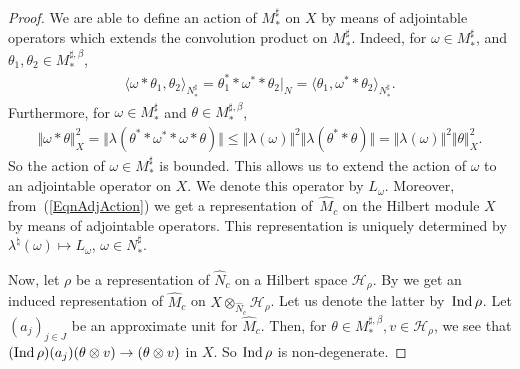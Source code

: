 \documentclass[pdftex]{sigma}
\numberwithin{equation}{section}
\theoremstyle{definition}
\newcommand{\cHil}{\mathcal{H}}
\newcommand{\Ind}{{\rm Ind}\,}
\begin{document}
\begin{proof}
We are able to def\/ine an action of $M_\ast^\sharp$ on $X$ by  means of adjointable operators which extends the convolution product on $M_\ast^\sharp$. Indeed, for $\omega\in M_\ast^\sharp$, and $\theta_1, \theta_2 \in M_\ast^{\sharp,\beta} $,
\begin{gather*}%
\langle \omega \ast \theta_1, \theta_2 \rangle_{N_\ast^\sharp} = \theta_1^\ast \ast \omega^\ast \ast \theta_2\vert_{N} =  \langle  \theta_1, \omega^\ast \ast \theta_2 \rangle_{N_\ast^\sharp}.
\end{gather*}
Furthermore, for $\omega \in M_\ast^\sharp$ and $\theta \in M_\ast^{\sharp, \beta}$,
\begin{gather}\label{EqnAdjAction}
\Vert \omega \ast \theta \Vert_X^2 = \Vert \lambda (\theta^\ast \ast \omega^\ast \ast \omega \ast \theta) \Vert \leq \Vert \lambda(\omega) \Vert^2 \Vert \lambda(\theta^\ast \ast \theta) \Vert = \Vert \lambda(\omega) \Vert^2 \Vert \theta\Vert_X^2.
\end{gather}
So the action of $\omega \in M_\ast^\sharp$ is bounded. This allows us to extend the action of $\omega$ to an adjointable operator on $X$. We denote this operator by $L_\omega$.  Moreover, from~(\ref{EqnAdjAction}) we get a representation of~$\hat{M}_c$ on the Hilbert module $X$ by means of adjointable operators. This representation is uniquely determined by $\lambda^\natural(\omega)   \mapsto L_\omega$, $\omega \in N_\ast^\sharp$.


Now, let $\rho$ be a representation of $\hat{N}_c$ on a Hilbert space $\cHil_\rho$. By  \cite[Proposition 2.66]{RaeWil} we get an induced representation of $\hat{M}_c$ on $X  \otimes_{\hat{N}_c} \cHil_\rho$. Let us denote the latter by~$\Ind \rho$. Let $(a_j)_{j \in J}$ be an approximate unit for $\hat{M}_c$. Then, for $\theta \in M_\ast^{\sharp, \beta}, v \in \cHil_\rho$, we see that $(\Ind \rho)(a_j) (\theta \otimes v) \rightarrow (\theta \otimes v)$ in $X$. So $\Ind \rho$ is non-degenerate.


\end{proof}
\end{document}

